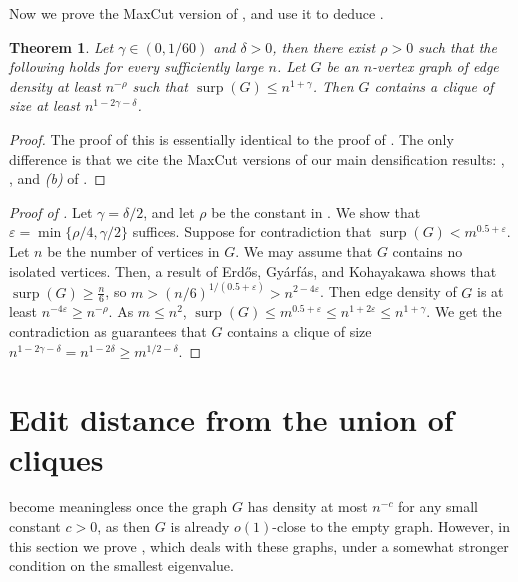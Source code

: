 \documentclass[11pt]{article}
\theoremstyle{plain}
\newtheorem{theorem}{Theorem}[section]
\theoremstyle{definition}
\DeclareMathOperator{\surp}{surp}
\newcommand{\eps}{\varepsilon}
\begin{document}
Now we prove the MaxCut version of , and use it to deduce .

\begin{theorem}\label{thm:clique_MaxCut}
  Let $\gamma\in (0,1/60)$ and $\delta>0$, then there exist $\rho>0$ such that the following holds for every sufficiently large $n$. Let $G$ be an $n$-vertex graph of edge density at least $n^{-\rho}$ such that $\surp(G)\leq n^{1+\gamma}$. Then $G$ contains a clique of size at least $n^{1-2\gamma-\delta}$.
\end{theorem}

\begin{proof}
The proof of this is essentially identical to the proof of . The only difference is that we cite the MaxCut versions of our main densification results:  , , and \textit{(b)} of . 
\end{proof}

\begin{proof}[Proof of ]
    Let $\gamma=\delta/2$, and let $\rho$ be the constant in . 
    We show that $\eps=\min\{\rho/4,\gamma/2\}$ suffices. 
    Suppose for contradiction that $\surp(G)< m^{0.5+\eps}$.
    Let $n$ be the number of vertices in $G$. 
    We may assume that $G$ contains no isolated vertices. 
    Then, a result of Erd\H{o}s, Gy\'arf\'as, and Kohayakawa \cite{EGyK} shows that $\surp(G)\ge\frac{n}{6}$, so $m>(n/6)^{1/(0.5+\eps)}>n^{2-4\eps}$.
    Then edge density of $G$ is at least $n^{-4\eps}\ge n^{-\rho}$. 
    As $m \le n^2$, $\surp(G)\leq m^{0.5+\eps}\leq n^{1+2\eps}\leq n^{1+\gamma}$.
    We get the contradiction as  guarantees that $G$ contains a clique of size $n^{1-2\gamma-\delta}=n^{1-2\delta}\geq m^{1/2-\delta}$.
\end{proof}

\section{Edit distance from the union of cliques}\label{sect:stab}

 become meaningless once the graph $G$ has density at most $n^{-c}$ for any small constant $c>0$, as then $G$ is already $o(1)$-close to the empty graph. 
However, in this section we prove , which deals with these graphs, under a somewhat stronger condition on the smallest eigenvalue.
\end{document}
